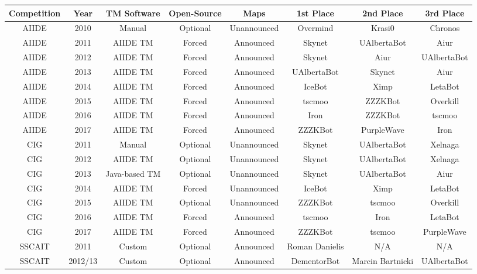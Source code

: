 \begin{table}[t] 
 
 \begin{center}
 \begin{tabular} {| c | c | c c c | c c c |}
 \hline
 \textbf{Competition} & \textbf{Year} & \textbf{TM Software} & \textbf{Open-Source} & \textbf{Maps} & \textbf{1st Place} & \textbf{2nd Place} & \textbf{3rd Place}\\
 \hline
 AIIDE & 2010 & Manual & Optional & Unannounced & Overmind & Krasi0 & Chronos \\
 \hline
 AIIDE & 2011 & AIIDE TM & Forced & Announced & Skynet & UAlbertaBot & Aiur \\
 \hline
 AIIDE & 2012 & AIIDE TM & Forced & Announced & Skynet & Aiur & UAlbertaBot\\
\hline
 AIIDE & 2013 & AIIDE TM & Forced & Announced & UAlbertaBot & Skynet & Aiur\\
\hline
 AIIDE & 2014 & AIIDE TM & Forced & Announced & IceBot & Ximp & LetaBot\\
\hline
 AIIDE & 2015 & AIIDE TM & Forced & Announced & tscmoo & ZZZKBot & Overkill\\
\hline
 AIIDE & 2016 & AIIDE TM & Forced & Announced & Iron & ZZZKBot & tscmoo\\
\hline
 AIIDE & 2017 & AIIDE TM & Forced & Announced & ZZZKBot & PurpleWave & Iron\\
\hline
 CIG & 2011 & Manual & Optional & Unannounced & Skynet & UAlbertaBot & Xelnaga\\
 \hline
 CIG & 2012 & AIIDE TM & Optional & Unannounced & Skynet & UAlbertaBot & Xelnaga\\
 \hline
 CIG & 2013 & Java-based TM & Optional & Unannounced & Skynet & UAlbertaBot & Aiur\\
 \hline
 CIG & 2014 & AIIDE TM & Forced & Unannounced & IceBot & Ximp & LetaBot\\
 \hline
 CIG & 2015 & AIIDE TM & Optional & Unannounced & ZZZKBot & tscmoo & Overkill\\
 \hline
 CIG & 2016 & AIIDE TM & Forced & Announced & tscmoo & Iron & LetaBot\\ 
 \hline
 CIG & 2017 & AIIDE TM & Forced & Announced & ZZZKBot & tscmoo & PurpleWave\\ 
 \hline   
 SSCAIT & 2011 & Custom & Optional & Announced & Roman Danielis & N/A & N/A\\
 \hline
 SSCAIT & 2012/13 & Custom & Optional & Announced & DementorBot & Marcin Bartnicki & UAlbertaBot\\

\end{tabular}
\end{center}
\end{table}
